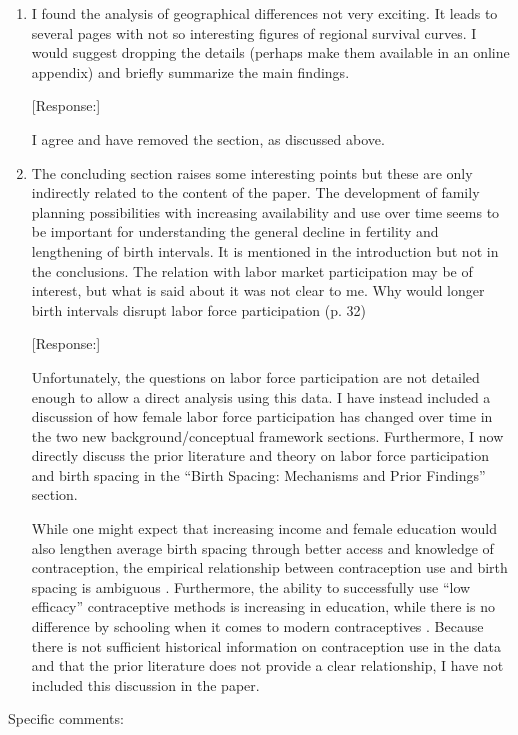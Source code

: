 \documentclass[letterpaper,12pt]{article}
\begin{document}
\begin{enumerate}
\item I found the analysis of geographical differences not very
exciting. It leads to several pages with not so interesting figures of
regional survival curves. I would suggest dropping the details (perhaps
make them available in an online appendix) and briefly summarize the
main findings.

[Response:]

I agree and have removed the section, as discussed above.


\item The concluding section raises some interesting points but these
are only indirectly related to the content of the paper. The development
of family planning possibilities with increasing availability and use
over time seems to be important for understanding the general decline in
fertility and lengthening of birth intervals. It is mentioned in the
introduction but not in the conclusions. The relation with labor market
participation may be of interest, but what is said about it was not
clear to me. Why would longer birth intervals disrupt labor force
participation (p. 32)

[Response:]

Unfortunately, the questions on labor force participation are not
detailed enough to allow a direct analysis using this data. I have
instead included a discussion of how female labor force participation
has changed over time in the two new background/conceptual framework
sections. Furthermore, I now directly discuss the prior literature and
theory on labor force participation and birth spacing in the ``Birth
Spacing: Mechanisms and Prior Findings'' section.

While one might expect that increasing income and female education would
also lengthen average birth spacing through better access and knowledge
of contraception, the empirical relationship between contraception use
and birth spacing is ambiguous 
\citep{Tulasidhar1993,Whitworth2002,Bhalotra2008,Yeakey2009,Kim2010,Soest2018}.
Furthermore, the ability to successfully use ``low efficacy''
contraceptive methods is increasing in education, while there is no
difference by schooling when it comes to modern contraceptives
\citep{Rosenzweig1989}.
Because there is not sufficient historical information on contraception
use in the data and that the prior literature does not provide a clear
relationship, I have not included this discussion in the paper.
\end{enumerate}

\noindent Specific comments:
\end{document}
